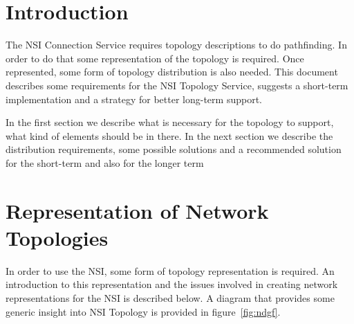 \documentclass[12pt]{article}  %
\begin{document}
\tableofcontents

\newcommand{\qq}{\symbol{34}} %
\newcommand{\q}{\symbol{39}} %
\newcommand{\underscore}{\symbol{95}} %

\newcommand{\MUST}{\textsc{must}}
\newcommand{\MUSTNOT}{\textsc{must not}}
\newcommand{\REQUIRED}{\textsc{required}}
\newcommand{\SHALL}{\textsc{shall}}
\newcommand{\SHALLNOT}{\textsc{shall not}}
\newcommand{\SHOULD}{\textsc{should}}
\newcommand{\SHOULDNOT}{\textsc{should not}}
\newcommand{\RECOMMENDED}{\textsc{recommended}}
\newcommand{\MAY}{\textsc{may}}
\newcommand{\OPTIONAL}{\textsc{optional}}

\newpage

\section{Introduction}

 The NSI Connection Service requires topology descriptions to do 
pathfinding. In order to do that some representation of the topology is required. 
Once represented, some form of topology distribution is also needed. This document 
describes some requirements for the NSI Topology Service, suggests a short-term 
implementation and a strategy for better long-term support.

 In the first section we describe what is necessary for the topology 
to support, what kind of elements should be in there. In the next section we describe 
the distribution requirements, some possible solutions and a recommended solution 
for the short-term and also for the longer term\label{h.15n4tpv97j8w}


\section{Representation of Network Topologies}

 In order to use the NSI, some form of topology representation 
is required. An introduction to this representation and the issues involved in 
creating network representations for the NSI is described below. A diagram that 
provides some generic insight into NSI Topology is provided in figure~\ref{fig:ndgf}.
\end{document}
